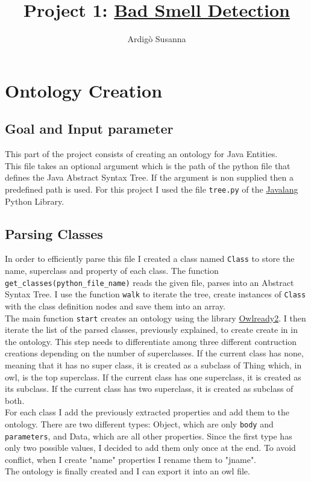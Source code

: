 \documentclass [14 pt]{article}
\title{Project 1: \href{https://github.com/SusyPinkBash/bad_smell_detection}{Bad Smell Detection}}
\author{Ardig\`o Susanna}
\begin{document}
\pagestyle{fancy}
\fancyhf{}
\cfoot{\thepage}

\begin{titlingpage}
\maketitle
\end{titlingpage}

\newpage\thispagestyle{plain}
\tableofcontents
\newpage

\section{Ontology Creation} %
\subsection{Goal and Input parameter}
This part of the project consists of creating an ontology for Java Entities.\\
This file takes an optional argument which is the path of the python file that defines the Java Abstract Syntax Tree. If the argument is non supplied then a predefined path is used. For this project I used the file \texttt{tree.py} of the \href{https://github.com/c2nes/javalang}{Javalang} Python Library. 

\subsection{Parsing Classes}
In order to efficiently parse this file I created a class named \texttt{Class} to store the name, superclass and property of each class.
The function \texttt{get\_classes(python\_file\_name)} reads the given file, parses into an Abstract Syntax Tree. I use the function \texttt{walk} to iterate the tree, create instances of \texttt{Class} with the class definition nodes and save them into an array.\\
The main function \texttt{start} creates an ontology using the library \href{https://pythonhosted.org/Owlready2/}{Owlready2}. I then iterate the list of the parsed classes, previously explained, to create create in in the ontology. This step needs to differentiate among three different contruction creations depending on the number of superclasses.
If the current class has none, meaning that it has no super class, it is created as a subclass of Thing which, in owl, is the top superclass.
If the current class has one superclass, it is created as its subclass.
If the current class has two superclass, it is created as subclass of both.\\
For each class I add the previously extracted properties and add them to the ontology. There are two different types: 
Object, which are only \texttt{body} and \texttt{parameters}, and Data, which are all other properties.
Since the first type has only two possible values, I decided to add them only once at the end. To avoid conflict, when I create "name" properties I rename them to "jname".\\
The ontology is finally created and I can export it into an owl file.
\end{document}
